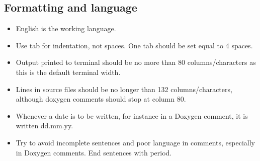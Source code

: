 \documentclass[10pt,a4paper]{article}
\begin{document}
\subsection{Formatting and language}

\begin{itemize}
	\item English is the working language.
	\item Use tab for indentation, not spaces. One tab should be set equal to 4 spaces.
	\item Output printed to terminal should be no more than 80 columns/characters as this is the default terminal width.
	\item Lines in source files should be no longer than 132 columns/characters, although doxygen comments should stop at column 80.
	\item Whenever a date is to be written, for instance in a Doxygen comment, it is written dd.mm.yy.
	\item Try to avoid incomplete sentences and poor language in comments, especially in Doxygen comments. End sentences with period.
\end{itemize}
\end{document}
